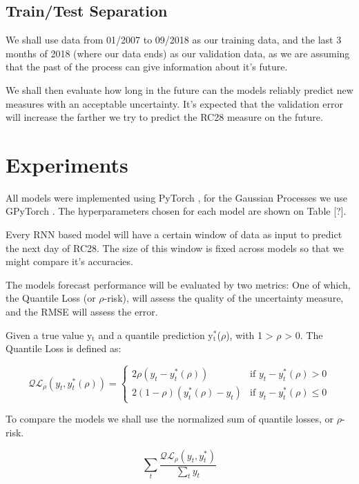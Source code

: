 \documentclass[11pt]{article}
\begin{document}
\subsection{Train/Test Separation}
\label{sec:org4af8edb}
We shall use data from 01/2007 to 09/2018 as our training data, and the last 3 months of 2018 (where our data ends) as our validation data, as we are assuming that the past of the process
can give information about it's future.

We shall then evaluate how long in the future can the models reliably predict new measures with an acceptable uncertainty.
It's expected that the validation error will increase the farther we try to predict the RC28 measure on the future.

\section{Experiments}
\label{sec:orge48456f}

All models were implemented using PyTorch \cite{pytorch}, for the Gaussian Processes we use GPyTorch \cite{gpytorch}. The hyperparameters chosen for each model are shown on Table [?]. 

Every RNN based model will have a certain window of data as input to predict the next day of RC28. The size of this window is fixed across models so that we might compare it's accuracies. 

The models forecast performance will be evaluated by two metrics: One of which, the Quantile Loss (or \(\rho\)-risk), will assess the quality of the uncertainty measure,
and the RMSE will assess the error. 

Given a true value y\(_{\text{t}}\) and a quantile prediction y\(^{\text{*}}_{\text{t}}\)(\(\rho\)), with  1 > \(\rho\) > 0. The Quantile Loss is defined as:


\begin{equation*}
  \mathcal{QL}_{\rho}(y_{t},y^{*}_{t}(\rho)) =
\begin{cases}
  2 \rho(y_{t} - y^{*}_{t}(\rho)) & \text{if }  y_{t} - y^{*}_{t}(\rho) > 0 \\
  2 (1 - \rho)(y^{*}_{t}(\rho) - y_{t}) & \text{if } y_{t} - y^{*}_{t}(\rho) \leq 0
\end{cases}
\end{equation*}

To compare the models we shall use the normalized sum of quantile losses, or \(\rho\)-risk. 

\begin{equation*}
\sum_{t}\frac{\mathcal{QL}_{\rho}(y_{t},y^{*}_{t})}{\sum_{t}y_{t}}
\end{equation*}
\end{document}
